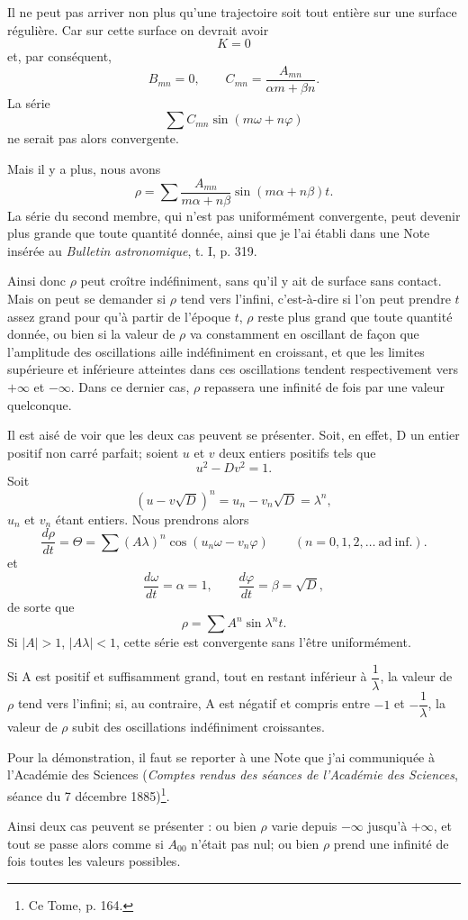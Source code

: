 \documentclass[11pt]{article}
\begin{document}
Il ne peut pas arriver non plus qu’une trajectoire soit tout entière sur une surface régulière. Car sur cette surface on devrait avoir
\[
K=0
\]
et, par conséquent,
\[
B_{mn}=0,
\qquad
C_{mn}=\frac{A_{mn}}{\alpha m+\beta n}.
\]
La série
\[
\sum C_{mn}\sin(m\omega+n\varphi)
\]
ne serait pas alors convergente.

Mais il y a plus, nous avons
\[
\rho=\sum \frac{A_{mn}}{m\alpha+n\beta}\sin(m\alpha+n\beta)t.
\]
La série du second membre, qui n’est pas uniformément convergente, peut devenir plus grande que toute quantité donnée, ainsi que je l’ai établi dans une Note insérée au \emph{Bulletin astronomique}, t. I, p. 319.

Ainsi donc $\rho$ peut croître indéfiniment, sans qu’il y ait de surface sans contact. Mais on peut se demander si $\rho$ tend vers l’infini, c’est-à-dire si l’on peut prendre $t$ assez grand pour qu’à partir de l’époque $t$, $\rho$ reste plus grand que toute quantité donnée, ou bien si la valeur de $\rho$ va constamment en oscillant de façon que l’amplitude des oscillations aille indéfiniment en croissant, et que les limites supérieure et inférieure atteintes dans ces oscillations tendent respectivement vers $+\infty$ et $-\infty$. Dans ce dernier cas, $\rho$ repassera une infinité de fois par une valeur quelconque.

Il est aisé de voir que les deux cas peuvent se présenter. Soit, en effet, D un entier positif non carré parfait; soient $u$ et $v$ deux entiers positifs tels que
\[
u^2-Dv^2=1.
\]
Soit
\[
(u-v\sqrt{D})^n=u_n-v_n\sqrt{D}=\lambda^n,
\]
$u_n$ et $v_n$ étant entiers. Nous prendrons alors
\[
\frac{d\rho}{dt}=\Theta=\sum(A\lambda)^n\cos(u_n\omega-v_n\varphi)
\qquad (n=0,1,2,\ldots\ \mathrm{ad\ inf.}).
\]
et
\[
\frac{d\omega}{dt}=\alpha=1,
\qquad
\frac{d\varphi}{dt}=\beta=\sqrt{D},
\]
de sorte que
\[
\rho=\sum A^n\sin\lambda^nt.
\]
Si $|A|>1$, $|A\lambda|<1$, cette série est convergente sans l’être uniformément.

Si A est positif et suffisamment grand, tout en restant inférieur à $\dfrac1\lambda$, la valeur de $\rho$ tend vers l’infini; si, au contraire, A est négatif et compris entre $-1$ et $-\dfrac1\lambda$, la valeur de $\rho$ subit des oscillations indéfiniment croissantes.

Pour la démonstration, il faut se reporter à une Note que j’ai communiquée à l’Académie des Sciences (\emph{Comptes rendus des séances de l’Académie des Sciences}, séance du 7 décembre 1885)\footnote{Ce Tome, p. 164.}.

Ainsi deux cas peuvent se présenter : ou bien $\rho$ varie depuis $-\infty$ jusqu’à $+\infty$, et tout se passe alors comme si $A_{00}$ n’était pas nul; ou bien $\rho$ prend une infinité de fois toutes les valeurs possibles.
\end{document}
